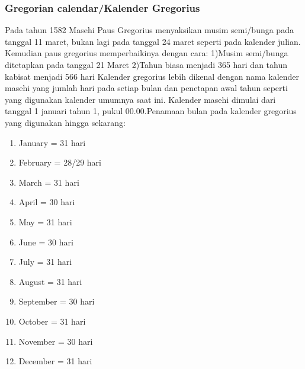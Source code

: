     \subsubsection{Gregorian calendar/Kalender Gregorius}
      Pada tahun 1582 Masehi Paus Gregorius menyaksikan musim semi/bunga pada tanggal 11 maret, bukan lagi pada tanggal 24 maret seperti pada kalender julian. Kemudian paus gregorius memperbaikinya dengan cara:
      1)Musim semi/bunga ditetapkan pada tanggal 21 Maret
      2)Tahun biasa menjadi 365 hari dan tahun kabisat menjadi 566 hari
      Kalender gregorius lebih dikenal dengan nama kalender masehi yang jumlah hari pada setiap bulan dan penetapan awal tahun seperti yang digunakan kalender umumnya saat ini. Kalender masehi dimulai dari tanggal 1 januari
      tahun 1, pukul 00.00.Penamaan bulan pada kalender gregorius yang digunakan hingga sekarang:
      \begin{enumerate}
        \item  January   = 31 hari
        \item  February  = 28/29 hari
        \item  March     = 31 hari
        \item  April     = 30 hari
        \item  May       = 31 hari
        \item  June      = 30 hari
        \item  July      = 31 hari
        \item  August    = 31 hari
        \item  September = 30 hari
        \item  October  = 31 hari
        \item  November = 30 hari
        \item  December = 31 hari
      \end{enumerate}

